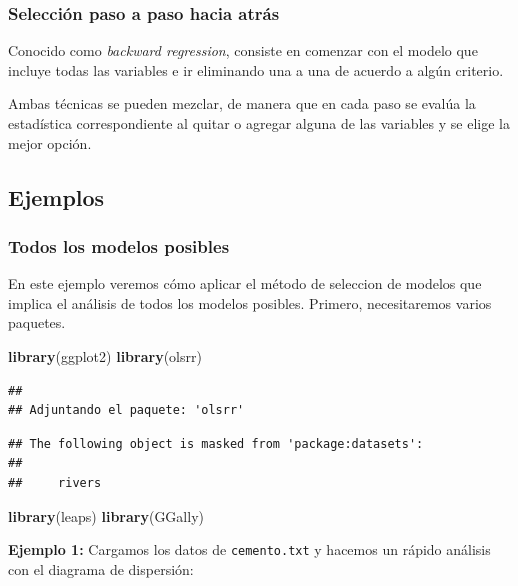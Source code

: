 \documentclass[
]{book}
\newenvironment{Shaded}{\begin{snugshade}}{\end{snugshade}}
\newcommand{\FunctionTok}[1]{\textcolor[rgb]{0.13,0.29,0.53}{\textbf{#1}}}
\newcommand{\NormalTok}[1]{#1}
\begin{document}
\subsubsection{Selección paso a paso hacia atrás}\label{selecciuxf3n-paso-a-paso-hacia-atruxe1s}

Conocido como \emph{backward regression}, consiste en comenzar con el modelo que incluye todas las variables e ir eliminando una a una de acuerdo a algún criterio.

Ambas técnicas se pueden mezclar, de manera que en cada paso se evalúa la estadística correspondiente al quitar o agregar alguna de las variables y se elige la mejor opción.

\subsection{Ejemplos}\label{ejemplos}

\subsubsection{Todos los modelos posibles}\label{todos-los-modelos-posibles-1}

En este ejemplo veremos cómo aplicar el método de seleccion de modelos que implica el análisis de todos los modelos posibles. Primero, necesitaremos varios paquetes.

\begin{Shaded}
\begin{Highlighting}[]
\FunctionTok{library}\NormalTok{(ggplot2)}
\FunctionTok{library}\NormalTok{(olsrr)}
\end{Highlighting}
\end{Shaded}

\begin{verbatim}
## 
## Adjuntando el paquete: 'olsrr'
\end{verbatim}

\begin{verbatim}
## The following object is masked from 'package:datasets':
## 
##     rivers
\end{verbatim}

\begin{Shaded}
\begin{Highlighting}[]
\FunctionTok{library}\NormalTok{(leaps)}
\FunctionTok{library}\NormalTok{(GGally)}
\end{Highlighting}
\end{Shaded}

\textbf{Ejemplo 1:} Cargamos los datos de \texttt{cemento.txt} y hacemos un rápido análisis con el diagrama de dispersión:
\end{document}
